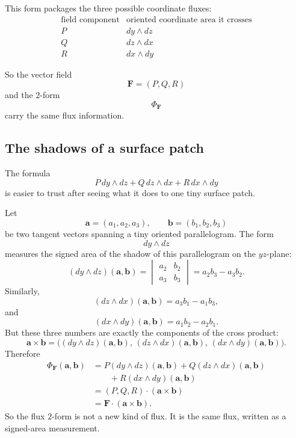 This form packages the three possible coordinate fluxes:
\[
\begin{array}{c|c}
\text{field component} & \text{oriented coordinate area it crosses} \\ \hline
P & dy\wedge dz\\[1mm]
Q & dz\wedge dx\\[1mm]
R & dx\wedge dy
\end{array}
\]

So the vector field
\[
    \mathbf F=(P,Q,R)
\]
and the \(2\)-form
\[
    \Phi_{\mathbf F}
\]
carry the same flux information.

\subsection{The shadows of a surface patch}

The formula
\[
    P\,dy\wedge dz
    +
    Q\,dz\wedge dx
    +
    R\,dx\wedge dy
\]
is easier to trust after seeing what it does to one tiny surface patch.

Let
\[
    \mathbf a=(a_1,a_2,a_3),
    \qquad
    \mathbf b=(b_1,b_2,b_3)
\]
be two tangent vectors spanning a tiny oriented parallelogram.  The form
\[
    dy\wedge dz
\]
measures the signed area of the shadow of this parallelogram on the \(yz\)-plane:
\[
    (dy\wedge dz)(\mathbf a,\mathbf b)
    =
    \begin{vmatrix}
    a_2&b_2\\
    a_3&b_3
    \end{vmatrix}
    =
    a_2b_3-a_3b_2.
\]
Similarly,
\[
    (dz\wedge dx)(\mathbf a,\mathbf b)
    =
    a_3b_1-a_1b_3,
\]
and
\[
    (dx\wedge dy)(\mathbf a,\mathbf b)
    =
    a_1b_2-a_2b_1.
\]
But these three numbers are exactly the components of the cross product:
\[
\boxed{
    \mathbf a\times\mathbf b
    =
    \bigl(
    (dy\wedge dz)(\mathbf a,\mathbf b),\,
    (dz\wedge dx)(\mathbf a,\mathbf b),\,
    (dx\wedge dy)(\mathbf a,\mathbf b)
    \bigr).
}
\]
Therefore
\[
\begin{aligned}
    \Phi_{\mathbf F}(\mathbf a,\mathbf b)
    &=
    P(dy\wedge dz)(\mathbf a,\mathbf b)
    +
    Q(dz\wedge dx)(\mathbf a,\mathbf b)\\
    &\qquad
    +
    R(dx\wedge dy)(\mathbf a,\mathbf b)\\
    &=
    (P,Q,R)\cdot(\mathbf a\times\mathbf b)\\
    &=
    \mathbf F\cdot(\mathbf a\times\mathbf b).
\end{aligned}
\]
So the flux \(2\)-form is not a new kind of flux.  It is the same flux, written as a
signed-area measurement.

